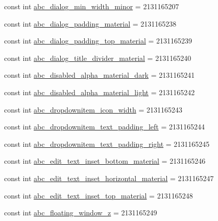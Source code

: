 \begin{CompactItemize}
\item 
const int \hyperlink{class__2doo_1_1_droid_1_1_resource_1_1_dimension_619d25bb28056ec23f1760067c1ca171}{abc\_\-dialog\_\-min\_\-width\_\-minor} = 2131165207
\item 
const int \hyperlink{class__2doo_1_1_droid_1_1_resource_1_1_dimension_a0ef5451a15552b33cf0ee2660536227}{abc\_\-dialog\_\-padding\_\-material} = 2131165238
\item 
const int \hyperlink{class__2doo_1_1_droid_1_1_resource_1_1_dimension_1389132dea220ab900767bbf10118456}{abc\_\-dialog\_\-padding\_\-top\_\-material} = 2131165239
\item 
const int \hyperlink{class__2doo_1_1_droid_1_1_resource_1_1_dimension_7b446a8d47421925d43ab99ad4612bc1}{abc\_\-dialog\_\-title\_\-divider\_\-material} = 2131165240
\item 
const int \hyperlink{class__2doo_1_1_droid_1_1_resource_1_1_dimension_edec455da1a83dbf392bc1ca0b5c6e75}{abc\_\-disabled\_\-alpha\_\-material\_\-dark} = 2131165241
\item 
const int \hyperlink{class__2doo_1_1_droid_1_1_resource_1_1_dimension_1216890cf7f00da35460e66f5042cc72}{abc\_\-disabled\_\-alpha\_\-material\_\-light} = 2131165242
\item 
const int \hyperlink{class__2doo_1_1_droid_1_1_resource_1_1_dimension_0f42ff0787e59d8aa3aea6de568c0b50}{abc\_\-dropdownitem\_\-icon\_\-width} = 2131165243
\item 
const int \hyperlink{class__2doo_1_1_droid_1_1_resource_1_1_dimension_e12c8b9c428304095225a204f3f8b81d}{abc\_\-dropdownitem\_\-text\_\-padding\_\-left} = 2131165244
\item 
const int \hyperlink{class__2doo_1_1_droid_1_1_resource_1_1_dimension_ed26380687d72fefe97ed8ba71d86d60}{abc\_\-dropdownitem\_\-text\_\-padding\_\-right} = 2131165245
\item 
const int \hyperlink{class__2doo_1_1_droid_1_1_resource_1_1_dimension_50069c7043c55b1653a58dcebd10c51c}{abc\_\-edit\_\-text\_\-inset\_\-bottom\_\-material} = 2131165246
\item 
const int \hyperlink{class__2doo_1_1_droid_1_1_resource_1_1_dimension_223b12217fe642fe60af225502d9259b}{abc\_\-edit\_\-text\_\-inset\_\-horizontal\_\-material} = 2131165247
\item 
const int \hyperlink{class__2doo_1_1_droid_1_1_resource_1_1_dimension_c24adc26183489bec036ac565f6c7b5d}{abc\_\-edit\_\-text\_\-inset\_\-top\_\-material} = 2131165248
\item 
const int \hyperlink{class__2doo_1_1_droid_1_1_resource_1_1_dimension_48182c3b5d15989ecdacbe7c442be294}{abc\_\-floating\_\-window\_\-z} = 2131165249

\end{CompactItemize}
